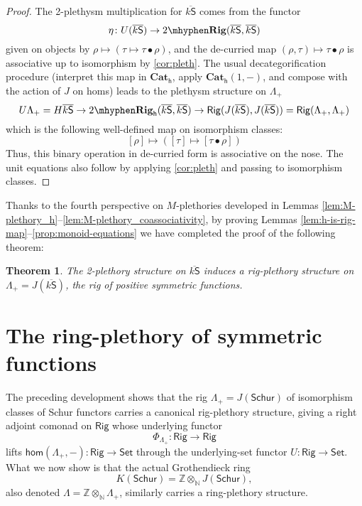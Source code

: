 \documentclass[12pt,reqno]{amsart}
\theoremstyle{plain}
\newtheorem{thm}{Theorem}
\theoremstyle{definition}
\theoremstyle{remark}
\newcommand{\comp}{\bullet}
\newcommand{\maps}{\colon}
\renewcommand{\hom}{\mathsf{hom}}
\newcommand{\category}[1]{\mathsf{#1}}
\newcommand{\N}{\mathbb N}
\renewcommand{\S}{\category S}
\newcommand{\Z}{\mathbb Z}
\newcommand{\namedcat}[1]{\mathsf{#1}}
\newcommand{\Rig}{\namedcat{Rig}}
\newcommand{\Set}{\namedcat{Set}}
\newcommand{\Schur}{\namedcat{Schur}}
\newcommand{\TRig}{2\mhyphen\namedbicat{Rig}}
\newcommand{\namedbicat}[1]{\mathbf{#1}}
\newcommand{\CCat}{\namedbicat{Cat}}
\newcommand{\ho}{_\mathsf{h}}
\newcommand{\ksbar}{\overline{k\S}}
\numberwithin{thm}{section}
\begin{document}
\begin{proof}
    The 2-plethysm multiplication for $\ksbar$ comes from the functor 
    \[
    \eta \maps U(\ksbar) \to \TRig(\ksbar, \ksbar) 
    \]
    given on objects by $\rho \mapsto (\tau \mapsto \tau \comp \rho)$,
    and the de-curried map $(\rho, \tau) \mapsto \tau \comp \rho$ is associative up to isomorphism by \cref{cor:pleth}. The usual decategorification procedure (interpret this map in $\CCat\ho$, apply $\CCat\ho(1, -)$, and compose with the action of $J$ on homs) leads to the plethysm structure on $\Lambda_+$
    \[ 
    U\Lambda_+ = H\ksbar \to \TRig\ho(\ksbar, \ksbar) \to \Rig(J(\ksbar), J(\ksbar)) = \Rig(\Lambda_+, \Lambda_+) 
    \]
    which is the following well-defined map on isomorphism classes: 
    \[ 
    [\rho] \mapsto ([\tau] \mapsto [\tau \comp \rho])
    \]
    Thus, this binary operation in de-curried form is associative on the nose. The unit equations also follow by applying  \cref{cor:pleth} and passing to isomorphism classes. 
\end{proof}

Thanks to the fourth perspective on $M$-plethories developed in Lemmas \ref{lem:M-plethory_h}--\ref{lem:M-plethory_coassociativity}, by proving Lemmas \ref{lem:h-is-rig-map}--\ref{prop:monoid-equations} we have completed the proof of the following theorem: 

\begin{thm}
\label{thm:lambdaplus-forms-rig-plethory}
    The 2-plethory structure on $\ksbar$ induces a rig-plethory structure on $\Lambda_+ = J(\ksbar)$, the rig of positive symmetric functions. 
\end{thm} 

\section{The ring-plethory of symmetric functions}
\label{sec:lambda}

The preceding development shows that the rig $\Lambda_+ = J(\Schur)$ of isomorphism classes of Schur functors carries a canonical rig-plethory structure, giving a right adjoint comonad on $\Rig$ whose underlying functor
\[\Phi_{\Lambda_+} \maps \Rig \to \Rig\]
lifts $\hom(\Lambda_+, -) \maps \Rig \to \Set$ through the underlying-set functor $U \maps \Rig \to \Set$. What we now show is that the actual Grothendieck ring 
\[K(\Schur) = \Z \otimes_\N J(\Schur), \]
also denoted $\Lambda = \Z \otimes_\N \Lambda_+$, similarly carries a ring-plethory structure. 
\end{document}
